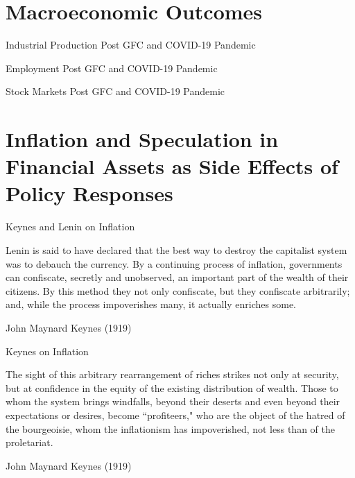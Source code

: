 \documentclass{beamer}
\begin{document}
\section{Macroeconomic Outcomes}

\begin{frame}{Industrial Production Post GFC and COVID-19 Pandemic}

\begin{figure}[h!]
     \centering
     
\end{figure} 
	
\end{frame}

\begin{frame}{Employment Post GFC and COVID-19 Pandemic}

\begin{figure}[h!]
     \centering
     
\end{figure} 
	
\end{frame}

\begin{frame}{Stock Markets Post GFC and COVID-19 Pandemic}

\begin{figure}[h!]
     \centering
     
\end{figure} 
	
\end{frame}

\section{Inflation and Speculation in Financial Assets as Side Effects of Policy Responses}

\begin{frame}{Keynes and Lenin on Inflation}
\epigraph{Lenin is said to have declared that the best way to destroy the capitalist system was to debauch the currency. By a continuing process of inflation, governments can confiscate, secretly and unobserved, an important part of the wealth of their citizens. By this method they not only confiscate, but they confiscate arbitrarily; and, while the process impoverishes many, it actually enriches some.}{John Maynard Keynes (1919)}	
\end{frame}


\begin{frame}{Keynes on Inflation}
\epigraph{The sight of this arbitrary rearrangement of riches strikes not only at security, but at confidence in the equity of the existing distribution of wealth. Those to whom the system brings windfalls, beyond their deserts and even beyond their expectations or desires, become ``profiteers," who are the object of the hatred of the bourgeoisie, whom the inflationism has impoverished, not less than of the proletariat.} {John Maynard Keynes (1919)}
\end{frame}
\end{document}
